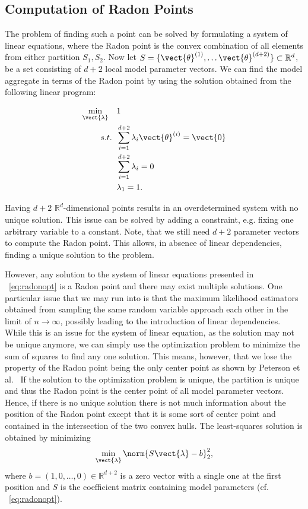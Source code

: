 \subsection{Computation of Radon Points}

The problem of finding such a point can be solved by formulating a system of linear equations, where the Radon point is the convex combination of all elements from either partition $S_1, S_2$.
Now let $S = \{\vect{\theta}^{(1)}, \ldots \vect{\theta}^{(d+2)}\} \subset \mathbb{R}^d$, be a set consisting of $d+2$ local model parameter vectors.
We can find the model aggregate in terms of the Radon point by using the solution obtained from the following linear program:

\begin{equation}
    \label{eq:radonopt}
    \begin{split}
        \min_{\vect{\lambda}} \quad &1 \\
        s.t. \;\; &\sum_{i=1}^{d+2} \lambda_i \vect{\theta}^{(i)} = \vect{0}\\
             \;\; &\sum_{i=1}^{d+2} \lambda_i = 0 \\
             \; \; & \lambda_1 = 1.
    \end{split}
\end{equation}

Having $d+2$ $\mathbb{R}^d$-dimensional points results in an overdetermined system with no unique solution.
This issue can be solved by adding a constraint, e.g. fixing one arbitrary variable to a constant. 
Note, that we still need $d+2$ parameter vectors to compute the Radon point.
This allows, in absence of linear dependencies, finding a unique solution to the problem.

However, any solution to the system of linear equations presented in \eq~\ref{eq:radonopt} is a Radon point and there may exist multiple solutions.
One particular issue that we may run into is that the maximum likelihood estimators obtained from sampling the same random variable approach each other in the limit of $n \rightarrow \infty$, possibly leading to the introduction of linear dependencies.
While this is an issue for the system of linear equation, as the solution may not be unique anymore, we can simply use the optimization problem to minimize the sum of squares to find any one solution.
This means, however, that we lose the property of the Radon point being the only center point as shown by Peterson et al.~\cite{peterson1972geometry}
If the solution to the optimization problem is unique, the partition is unique and thus the Radon point is the center point of all model parameter vectors.
Hence, if there is no unique solution there is not much information about the position of the Radon point except that it is some sort of center point and contained in the intersection of the two convex hulls.
The least-squares solution is obtained by minimizing
\begin{equation}
    \label{eq:lstsq}
        \min_{\vect{\lambda}} \norm{S\vect{\lambda} - b}^2_2,
\end{equation}
where $b=(1, 0, \ldots, 0) \in \mathbb{R}^{d+2}$ is a zero vector with a single one at the first position and $S$ is the coefficient matrix containing model parameters (cf. \eq~\ref{eq:radonopt}).

